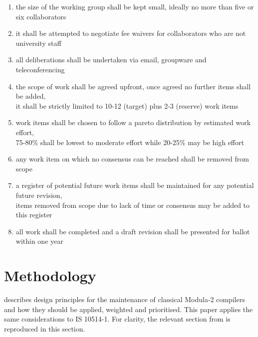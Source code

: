 \documentclass[10pt,a4paper,leqno,fleqn]{article}
\begin{document}
\renewcommand{\labelenumi}{(\arabic{enumi})}
\begin{enumerate}[leftmargin=!, labelindent=-0.75em, itemindent=0em]
\item the size of the working group shall be kept small,
ideally no more than five or six collaborators
\item it shall be attempted to negotiate fee waivers for collaborators who are not
university staff
\item all deliberations shall be undertaken via email, groupware and
teleconferencing
\item the scope of work shall be agreed upfront, once agreed no further items
shall be added, \\
it shall be strictly limited to 10-12 (target) plus 2-3 (reserve) work items
\item work items shall be chosen to follow a pareto distribution by estimated
work effort, \\
75-80\% shall be lowest to moderate effort while 20-25\% may be high effort
\item any work item on which no consensus can be reached shall be removed
from scope
\item a register of potential future work items shall be maintained for any
potential future revision, \\
items removed from scope due to lack of time or consensus may be added
to this register
\item all work shall be completed and a draft revision shall be presented for
ballot within one year
\end{enumerate}


\section{Methodology}

\cite{Kowarsch18} describes design principles for the maintenance of
classical Modula-2 compilers and how they should be applied, weighted
and prioritised. This paper applies the same considerations to IS 10514-1.
For clarity, the relevant section from \cite{Kowarsch18} is reproduced in
this section.

\end{document}
